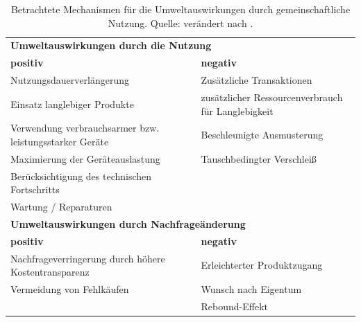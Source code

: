 \documentclass[11pt, titlepage=true]{scrartcl} %
\begin{document}
\begin{table}[h]
	\begin{tabular}{p{7cm}p{7cm}}
		 \toprule
		 \multicolumn{2}{l}{\textbf{Umweltauswirkungen durch die Nutzung}} \vspace{0.2 cm} \\
		 \textbf{positiv} & \textbf{negativ} \\
		 \midrule
		 Nutzungsdauer\-verlängerung \vspace{0.2cm} &  Zusätzliche Transaktionen \vspace{0.2cm} \\
		 Einsatz langlebiger Produkte \vspace{0.2cm} &  zusätzlicher Ressourcenverbrauch für Langlebigkeit \vspace{0.2cm} \\
		 Verwendung verbrauchsarmer bzw. leistungsstarker Geräte \vspace{0.2cm} &  Beschleunigte Ausmusterung \vspace{0.2cm} \\
		 Maximierung der Geräteauslastung \vspace{0.2cm} & Tauschbedingter Verschleiß \vspace{0.2cm} \\
		 Berücksichtigung des technischen Fortschritts \vspace{0.2cm} & \vspace{0.2cm} \\
		 Wartung / Reparaturen \vspace{0.5cm}& \\
		 \midrule
		 \multicolumn{2}{l}{\textbf{Umweltauswirkungen durch Nachfrageänderung}} \vspace{0.2 cm} \\
		 \textbf{positiv} & \textbf{negativ} \\
		 \midrule
		 Nachfrageverringerung durch höhere Kostentransparenz \vspace{0.2cm} & Erleichterter Produktzugang \vspace{0.2cm} \\
		 Vermeidung von Fehlkäufen \vspace{0.2cm} & Wunsch nach Eigentum \vspace{0.5cm} \\
		  & Rebound-Effekt \vspace{0.2cm} \\
		 \bottomrule
	\end{tabular}
	\caption{Betrachtete Mechanismen für die Umweltauswirkungen durch gemeinschaftliche Nutzung. Quelle: verändert nach \cite{scholl_marketing_2009}.}
	\label{tab:Mechanismen}
\end{table}
\end{document}
